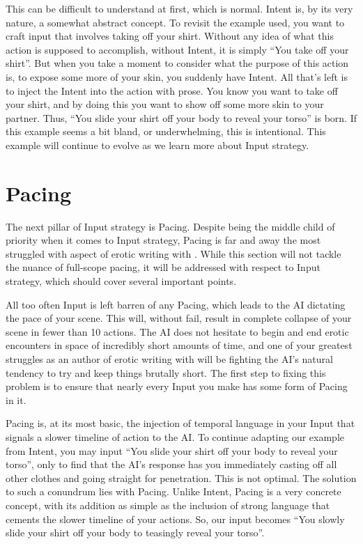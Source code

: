 \documentclass[Coomer-main.tex]{subfiles}
\begin{document}
This can be difficult to understand at first, which is normal.
Intent is, by its very nature, a somewhat abstract concept.
To revisit the example used, you want to craft input that involves taking off your shirt.
Without any idea of what this action is supposed to accomplish, without Intent, it is simply “You take off your shirt”.
But when you take a moment to consider what the purpose of this action is, to expose some more of your skin, you suddenly have Intent.
All that’s left is to inject the Intent into the action with prose.
You know you want to take off your shirt, and by doing this you want to show off some more skin to your partner.
Thus, “You slide your shirt off your body to reveal your torso” is born.
If this example seems a bit bland, or underwhelming, this is intentional.
This example will continue to evolve as we learn more about Input strategy.

\section{Pacing}

The next pillar of Input strategy is Pacing.
Despite being the middle child of priority when it comes to Input strategy, Pacing is far and away the most struggled with aspect of erotic writing with \aid.
While this section will not tackle the nuance of full-scope pacing, it will be addressed with respect to Input strategy, which should cover several important points.

All too often Input is left barren of any Pacing, which leads to the AI dictating the pace of your scene.
This will, without fail, result in complete collapse of your scene in fewer than 10 actions.
The AI does not hesitate to begin and end erotic encounters in space of incredibly short amounts of time, and one of your greatest struggles as an author of erotic writing with \aid will be fighting the AI’s natural tendency to try and keep things brutally short.
The first step to fixing this problem is to ensure that nearly every Input you make has some form of Pacing in it.

Pacing is, at its most basic, the injection of temporal language in your Input that signals a slower timeline of action to the AI.
To continue adapting our example from Intent, you may input “You slide your shirt off your body to reveal your torso”, only to find that the AI’s response has you immediately casting off all other clothes and going straight for penetration.
This is not optimal.
The solution to such a conundrum lies with Pacing.
Unlike Intent, Pacing is a very concrete concept, with its addition as simple as the inclusion of strong language that cements the slower timeline of your actions.
So, our input becomes “You slowly slide your shirt off your body to teasingly reveal your torso”.
\end{document}
